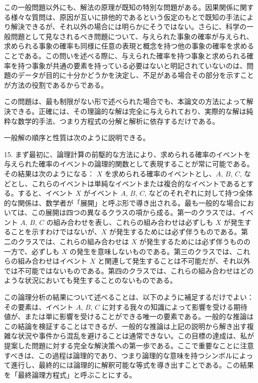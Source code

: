 \documentclass[a4paper,11pt,openany]{ltjsbook}
\begin{document}
この一般問題以外にも、解法の原理が既知の特別な問題がある。因果関係に関する様々な質問は、原因が互いに排他的であるという仮定のもとで既知の手法により解決できるが、それ以外の場合には明らかにそうではない。さらに、科学の一般問題として見なされるべき問題について、与えられた事象の確率が与えられ、求められる事象の確率も同様に任意の表現と概念を持つ他の事象の確率を求めることである。この問いを述べる際に、与えられた確率を持つ事象と求められる確率を持つ事象が共通の要素を持っている必要はないと明記されていないのは、問題のデータが目的に十分かどうかを決定し、不足がある場合その部分を示すことが方法の役割であるからである。

この問題は、最も制限がない形で述べられた場合でも、本論文の方法によって解決できる。正確には、その理論的な解は完全に与えられており、実際的な解は純粋な数学的手法、つまり方程式の分解と解析に依存するだけである。

一般解の順序と性質は次のように説明できる。

15. まず最初に、論理計算の前駆的な方法により、求められる確率のイベントを与えられた確率のイベントの論理的関数として表現することが常に可能である。その結果は次のようになる：
$X$ を求められる確率のイベントとし、$A$, $B$, $C$, などとし、これらのイベントは単純なイベントまたは複合的なイベントであるとする。すると、イベント $X$ がイベント $A$, $B$, $C$, などのそれぞれに対して持つ全体的な関係は、数学者が「展開」と呼ぶ形で導き出される。最も一般的な場合においては、この展開は四つの異なるクラスの項から成る。第一のクラスでは、イベント $A$, $B$, $C$ の組み合わせを表し、これらの組み合わせは必ずしも $X$ が発生することを示すわけではないが、$X$ が発生するためには必ず伴うものである。第二のクラスでは、これらの組み合わせは $X$ が発生するためには必ず伴うものの一方で、必ずしも $X$ の発生を意味しないものである。第三のクラスでは、これらの組み合わせはイベント $X$ と関連して発生することは不可能だが、それ以外では不可能ではないものである。第四のクラスでは、これらの組み合わせはどのような状況においても発生することのないものである。

この論理分析の結果について述べることは、以下のように補足するだけでよい：その要素は、イベント $A$, $B$, $C$ に対する我々の知識によって影響を受ける期待値が、または単に影響を受けることができる唯一の要素である。一般的な推論はこの結論を検証することはできるが、一般的な推論は上記の説明から解き出す複雑な状況や事件から混乱を避けることは通常できない。この目標の達成は、私が提案した問題に対する完全な解決策への第一歩である。ここで重要なことに注意すべきは、この過程は論理的であり、つまり論理的な意味を持つシンボルによって進行し、最終的には論理的に解釈可能な等式を導き出すことである。この結果を「最終論理方程式」と呼ぶことにする。
\end{document}
